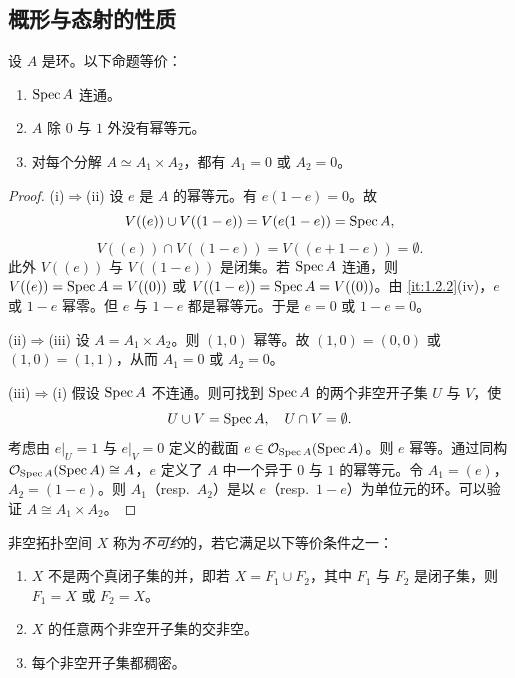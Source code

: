 \subsection{概形与态射的性质}
\label{sec:1.3}

\begin{proposition}\label{it:1.3.1}
设 $A$ 是环。以下命题等价：
\begin{enumerate}[label=(\roman*),leftmargin=2.8em]
  \item $\operatorname{Spec} A$ 连通。
  \item $A$ 除 $0$ 与 $1$ 外没有幂等元。
  \item 对每个分解 $A\simeq A_1\times A_2$，都有 $A_1=0$ 或 $A_2=0$。
\end{enumerate}
\end{proposition}

\begin{proof}
(i)$\Rightarrow$(ii) 设 $e$ 是 $A$ 的幂等元。有 $e(1-e)=0$。故
\[
V((e))\cup V((1-e))=V(e(1-e))=\operatorname{Spec} A,
\]
\[
V((e))\cap V((1-e))=V((e+1-e))=\emptyset.
\]
此外 $V((e))$ 与 $V((1-e))$ 是闭集。若 $\operatorname{Spec} A$ 连通，则 $V((e))=\operatorname{Spec} A=V((0))$ 或 $V((1-e))=\operatorname{Spec} A=V((0))$。由 \ref{it:1.2.2}(iv)，$e$ 或 $1-e$ 幂零。但 $e$ 与 $1-e$ 都是幂等元。于是 $e=0$ 或 $1-e=0$。

(ii)$\Rightarrow$(iii) 设 $A=A_1\times A_2$。则 $(1,0)$ 幂等。故 $(1,0)=(0,0)$ 或 $(1,0)=(1,1)$，从而 $A_1=0$ 或 $A_2=0$。

(iii)$\Rightarrow$(i) 假设 $\operatorname{Spec} A$ 不连通。则可找到 $\operatorname{Spec} A$ 的两个非空开子集 $U$ 与 $V$，使
\[
U\cup V=\operatorname{Spec} A,\quad U\cap V=\emptyset.
\]
考虑由 $e|_U=1$ 与 $e|_V=0$ 定义的截面 $e\in\mathcal{O}_{\operatorname{Spec} A}(\operatorname{Spec} A)$。则 $e$ 幂等。通过同构 $\mathcal{O}_{\operatorname{Spec} A}(\operatorname{Spec} A)\cong A$，$e$ 定义了 $A$ 中一个异于 $0$ 与 $1$ 的幂等元。令 $A_1=(e)$，$A_2=(1-e)$。则 $A_1$（resp.\ $A_2$）是以 $e$（resp.\ $1-e$）为单位元的环。可以验证 $A\cong A_1\times A_2$。
\end{proof}

非空拓扑空间 $X$ 称为\emph{不可约}的，若它满足以下等价条件之一：
\begin{enumerate}[label=(\roman*),leftmargin=2.8em]
  \item $X$ 不是两个真闭子集的并，即若 $X=F_1\cup F_2$，其中 $F_1$ 与 $F_2$ 是闭子集，则 $F_1=X$ 或 $F_2=X$。
  \item $X$ 的任意两个非空开子集的交非空。
  \item 每个非空开子集都稠密。
\end{enumerate}

